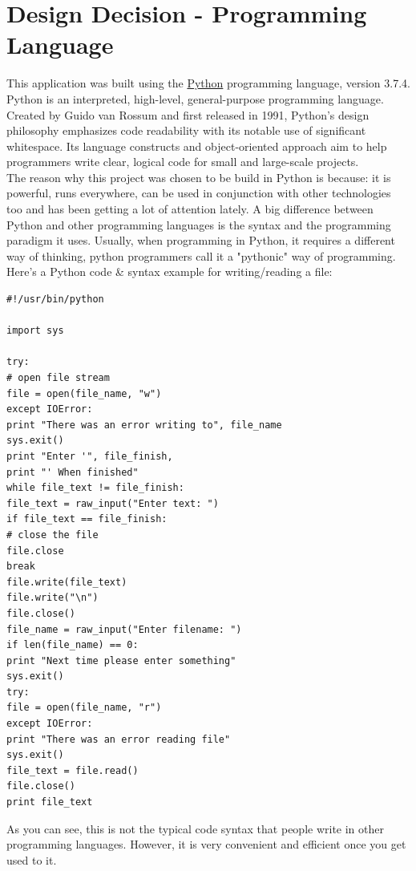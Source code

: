 \section{Design Decision - Programming Language}
This application was built using the \href{https://python.org/}{Python} programming language, version 3.7.4.\\
\newline
Python is an interpreted, high-level, general-purpose programming language. Created by Guido van Rossum and first released in 1991, Python's design philosophy emphasizes code readability with its notable use of significant whitespace. Its language constructs and object-oriented approach aim to help programmers write clear, logical code for small and large-scale projects. \cite{WhatIsPython}\\
\newline
The reason why this project was chosen to be build in Python is because: it is powerful, runs everywhere, can be used in conjunction with other technologies too and has been getting a lot of attention lately.
A big difference between Python and other programming languages is the syntax and the programming paradigm it uses. Usually, when programming in Python, it requires a different way of thinking, python programmers call it a "pythonic" way of programming.\\
\newline
Here's a Python code \& syntax example for writing/reading a file:  \cite{PythonTutorialsPoint}
\begin{verbatim}
#!/usr/bin/python

import sys

try:
# open file stream
file = open(file_name, "w")
except IOError:
print "There was an error writing to", file_name
sys.exit()
print "Enter '", file_finish,
print "' When finished"
while file_text != file_finish:
file_text = raw_input("Enter text: ")
if file_text == file_finish:
# close the file
file.close
break
file.write(file_text)
file.write("\n")
file.close()
file_name = raw_input("Enter filename: ")
if len(file_name) == 0:
print "Next time please enter something"
sys.exit()
try:
file = open(file_name, "r")
except IOError:
print "There was an error reading file"
sys.exit()
file_text = file.read()
file.close()
print file_text
\end{verbatim}
As you can see, this is not the typical code syntax that people write in other programming languages. However, it is very convenient and efficient once you get used to it.\\
\newpage
